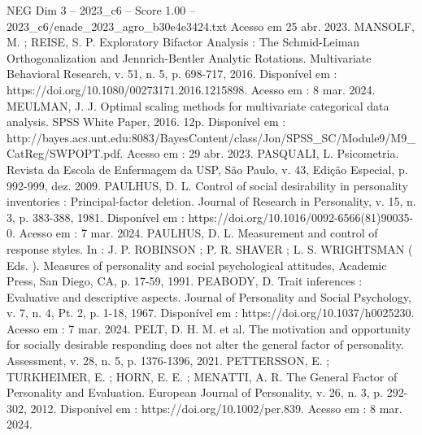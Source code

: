 \begin{textsample}{NEG Dim 3 – 2023\_c6 – Score 1.00 – 2023\_c6/enade\_2023\_agro\_b30e4e3424.txt}
Acesso em 25 abr. 2023.
MANSOLF, M. ; REISE, S.
P.
Exploratory Bifactor Analysis : The Schmid-Leiman Orthogonalization and Jennrich-Bentler Analytic Rotations.
Multivariate Behavioral Research, v. 51, n. 5, p. 698-717, 2016.
Disponível em : https://doi.org/10.1080/00273171.2016.1215898.
Acesso em : 8 mar. 2024.
MEULMAN, J.
J.
Optimal scaling methods for multivariate categorical data analysis.
SPSS White Paper, 2016. 12p.
Disponível em : http://bayes.acs.unt.edu:8083/BayesContent/class/Jon/SPSS\_SC/Module9/M9\_CatReg/SWPOPT.pdf.
Acesso em : 29 abr. 2023.
PASQUALI, L.
Psicometria.
Revista da Escola de Enfermagem da USP, São Paulo, v. 43, Edição Especial, p. 992-999, dez. 2009.
PAULHUS, D.
L.
Control of social desirability in personality inventories : Principal-factor deletion.
Journal of Research in Personality, v. 15, n. 3, p. 383-388, 1981.
Disponível em : https://doi.org/10.1016/0092-6566(81)90035-0.
Acesso em : 7 mar. 2024.
PAULHUS, D.
L.
Measurement and control of response styles.
In : J.
P.
ROBINSON ; P.
R.
SHAVER ; L.
S.
WRIGHTSMAN ( Eds. ).
Measures of personality and social psychological attitudes, Academic Press, San Diego, CA, p. 17-59, 1991.
PEABODY, D.
Trait inferences : Evaluative and descriptive aspects.
Journal of Personality and Social Psychology, v. 7, n. 4, Pt. 2, p. 1-18, 1967.
Disponível em : https://doi.org/10.1037/h0025230.
Acesso em : 7 mar. 2024.
PELT, D.
H.
M. et al.
The motivation and opportunity for socially desirable responding does not alter the general factor of personality.
Assessment, v. 28, n. 5, p. 1376-1396, 2021.
PETTERSSON, E. ; TURKHEIMER, E. ; HORN, E.
E. ; MENATTI, A.
R.
The General Factor of Personality and Evaluation.
European Journal of Personality, v. 26, n. 3, p. 292-302, 2012.
Disponível em : https://doi.org/10.1002/per.839.
Acesso em : 8 mar. 2024.

\end{textsample}
